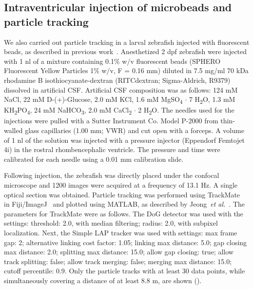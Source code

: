 \documentclass{WileyMSP-template}
\begin{document}
\subsection{Intraventricular injection of microbeads and particle tracking}

We also carried out
particle tracking in a larval zebrafish injected with fluorescent beads, as described in previous work~\cite{Olstad2019CiliaryDevelopment}.
Anesthetized 2 dpf zebrafish were injected with 1 nl of a mixture containing 0.1\% w/v fluorescent beads
(SPHERO Fluorescent Yellow Particles 1\% w/v, F = 0.16 mm) diluted
in 7.5 mg/ml 70 kDa rhodamine B isothiocyanate-dextran (RITCdextran; Sigma-Aldrich, R9379)
dissolved in artificial CSF. Artificial CSF composition was as follows:
124 mM NaCl, 22 mM D-(+)-Glucose, 2.0 mM KCl, 1.6 mM MgSO\textsubscript{4} $\cdot$ 7 H\textsubscript{2}O,
1.3 mM KH\textsubscript{2}PO\textsubscript{4}, 24 mM NaHCO\textsubscript{3},
2.0 mM CaCl\textsubscript{2} $\cdot$ 2 H\textsubscript{2}O.
The needles used for the injections were pulled with a
Sutter Instrument Co. Model P-2000 from thin-walled glass
capillaries (1.00 mm; VWR) and cut open with a forceps.
A volume of 1 nl of the solution was injected with a pressure injector
(Eppendorf Femtojet 4i) in the rostral rhombencephalic ventricle.
The pressure and time were calibrated for each needle using a 0.01 mm calibration slide.

Following injection, the zebrafish was directly placed under the confocal
microscope and 1200 images were acquired at a frequency of 13.1 Hz.
A single optical section was obtained. Particle tracking was performed using
TrackMate~\cite{Tinevez2017TrackMate:Tracking} in Fiji/ImageJ~\cite{Schindelin2012Fiji:Analysis}
and plotted using MATLAB, as described by Jeong~\emph{et al.}~\cite{Jeong2022MeasurementTelencephalon}.
The parameters for TrackMate were as follows.
The DoG detector was used with the settings: threshold: 2.0, with
median filtering; radius: 2.0, with subpixel localization.
Next, the Simple LAP tracker was used with settings: max frame gap: 2;
alternative linking cost factor: 1.05; linking max distance: 5.0; gap closing max distance: 2.0;
splitting max distance: 15.0; allow gap closing: true; allow track splitting:
false; allow track merging: false; merging max distance: 15.0; cutoff percentile: 0.9.
Only the particle tracks with at least 30 data points, while simultaneously
covering a distance of at least 8.8 \textmu m, are shown ().
\end{document}
